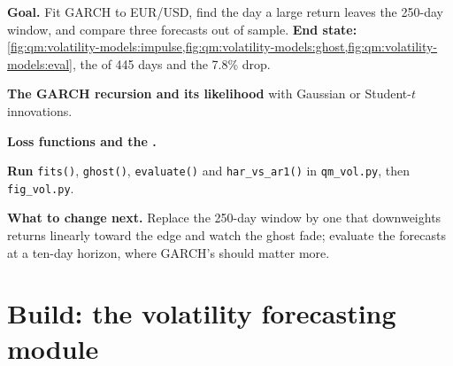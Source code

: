 \begin{tutorial}
\textbf{Goal.} Fit GARCH to EUR/USD, find the day a large return leaves the 250-day window, and compare three forecasts out of sample.
\textbf{End state:} \cref{fig:qm:volatility-models:impulse,fig:qm:volatility-models:ghost,fig:qm:volatility-models:eval}, the  of 445 days and the 7.8\%
drop.
\begin{tutsteps}
\item \textbf{The GARCH recursion and its likelihood} with Gaussian or Student-$t$ innovations.
\label{lst:qm:volatility-models:filter}
\item \textbf{Loss functions and the .}
\label{lst:qm:volatility-models:dm}
\item \textbf{Run} \texttt{fits()}, \texttt{ghost()}, \texttt{evaluate()} and \texttt{har\_vs\_ar1()} in \texttt{qm\_vol.py}, then \texttt{fig\_vol.py}.
\end{tutsteps}
\textbf{What to change next.} Replace the 250-day window by one that downweights returns linearly toward the edge and watch the ghost fade; evaluate the forecasts
at a ten-day horizon, where GARCH's  should matter more.
\end{tutorial}

\section{Build: the volatility forecasting module}\label{bld:qm:volatility-models:volfcst}


